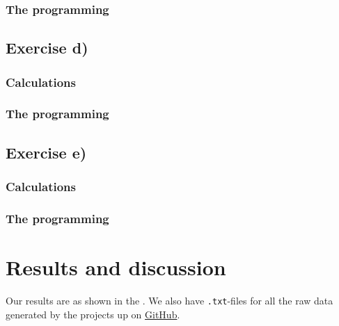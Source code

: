 \documentclass{article}
\begin{document}
\begin{multicols}{2}
  \subsubsection{The programming}




\subsection{Exercise d)} \label{sec:Method d)}

  \subsubsection{Calculations}




  \subsubsection{The programming}



\subsection{Exercise e)} \label{sec:Method e)}


  \subsubsection{Calculations}




  \subsubsection{The programming}





\vspace{1cm}

\section{Results and discussion} \label{sec:Results}

  Our results are as shown in the . We also have \texttt{.txt}-files for all the raw data generated by the projects up on \href{https://github.com/Erikbgram/Fys3150}{GitHub}. \\


\end{multicols}
\end{document}
